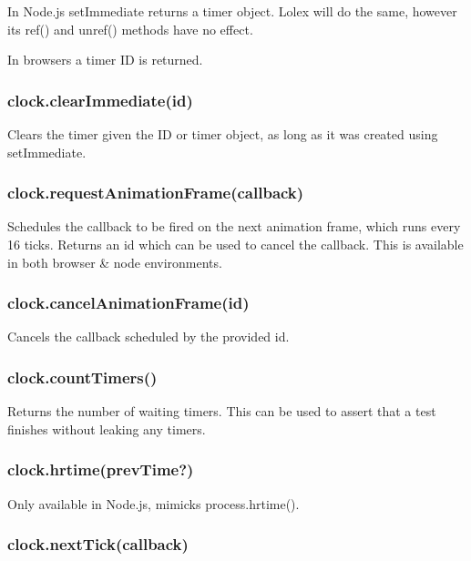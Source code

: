 In Node.\+js {\ttfamily set\+Immediate} returns a timer object. Lolex will do the same, however its {\ttfamily ref()} and {\ttfamily unref()} methods have no effect.

In browsers a timer ID is returned.

\subsubsection*{{\ttfamily clock.\+clear\+Immediate(id)}}

Clears the timer given the ID or timer object, as long as it was created using {\ttfamily set\+Immediate}.

\subsubsection*{{\ttfamily clock.\+request\+Animation\+Frame(callback)}}

Schedules the callback to be fired on the next animation frame, which runs every 16 ticks. Returns an {\ttfamily id} which can be used to cancel the callback. This is available in both browser \& node environments.

\subsubsection*{{\ttfamily clock.\+cancel\+Animation\+Frame(id)}}

Cancels the callback scheduled by the provided id.

\subsubsection*{{\ttfamily clock.\+count\+Timers()}}

Returns the number of waiting timers. This can be used to assert that a test finishes without leaking any timers.

\subsubsection*{{\ttfamily clock.\+hrtime(prev\+Time?)}}

Only available in Node.\+js, mimicks process.\+hrtime().

\subsubsection*{{\ttfamily clock.\+next\+Tick(callback)}}

